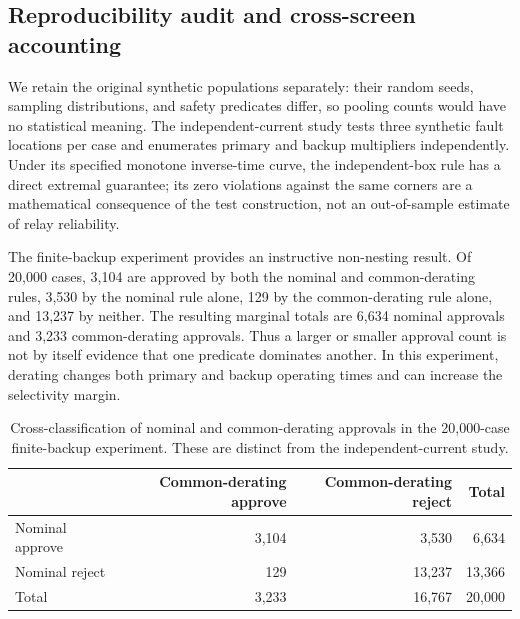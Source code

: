 \subsection{Reproducibility audit and cross-screen accounting}
\label{sec:repro-audit}
We retain the original synthetic populations separately: their random seeds, sampling distributions, and safety predicates differ, so pooling counts would have no statistical meaning. The independent-current study tests three synthetic fault locations per case and enumerates primary and backup multipliers independently. Under its specified monotone inverse-time curve, the independent-box rule has a direct extremal guarantee; its zero violations against the same corners are a mathematical consequence of the test construction, not an out-of-sample estimate of relay reliability.

The finite-backup experiment provides an instructive non-nesting result. Of 20,000 cases, 3,104 are approved by both the nominal and common-derating rules, 3,530 by the nominal rule alone, 129 by the common-derating rule alone, and 13,237 by neither. The resulting marginal totals are 6,634 nominal approvals and 3,233 common-derating approvals. Thus a larger or smaller approval count is not by itself evidence that one predicate dominates another. In this experiment, derating changes both primary and backup operating times and can increase the selectivity margin.

\begin{table}[H]
\centering
\caption{Cross-classification of nominal and common-derating approvals in the 20,000-case finite-backup experiment. These are distinct from the independent-current study.}
\label{tab:finite-cross}
\begin{tabular}{lrrr}\toprule
 & Common-derating approve & Common-derating reject & Total\\\midrule
Nominal approve & 3,104 & 3,530 & 6,634\\
Nominal reject & 129 & 13,237 & 13,366\\\midrule
Total & 3,233 & 16,767 & 20,000\\\bottomrule
\end{tabular}
\end{table}

